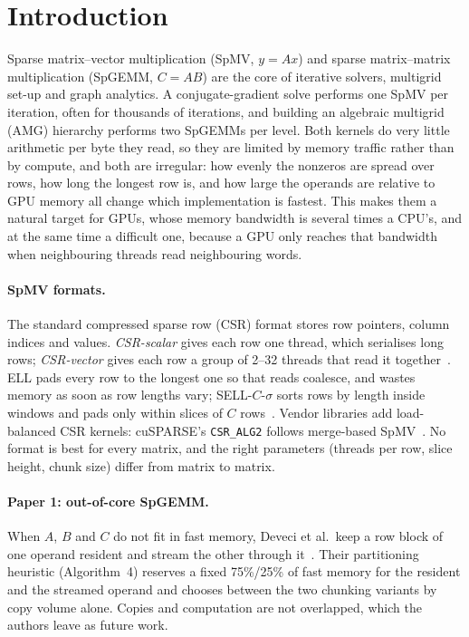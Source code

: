 \section{Introduction}\label{sec:intro}

Sparse matrix--vector multiplication (SpMV, $y = Ax$) and sparse matrix--matrix multiplication (SpGEMM,
$C = AB$) are the core of iterative solvers, multigrid set-up and graph analytics. A conjugate-gradient solve
performs one SpMV per iteration, often for thousands of iterations, and building an algebraic multigrid (AMG)
hierarchy performs two SpGEMMs per level. Both kernels do very little arithmetic per byte they read, so they are
limited by memory traffic rather than by compute, and both are irregular: how evenly the nonzeros are spread over
rows, how long the longest row is, and how large the operands are relative to GPU memory all change which
implementation is fastest. This makes them a natural target for GPUs, whose memory bandwidth is several times a
CPU's, and at the same time a difficult one, because a GPU only reaches that bandwidth when neighbouring threads read
neighbouring words.

\paragraph{SpMV formats.} The standard compressed sparse row (CSR) format stores row pointers, column indices and
values. \emph{CSR-scalar} gives each row one thread, which serialises long rows; \emph{CSR-vector} gives each row a
group of 2--32 threads that read it together~\cite{bell2009spmv}. ELL pads every row to the longest one so that reads
coalesce, and wastes memory as soon as row lengths vary; SELL-$C$-$\sigma$ sorts rows by length inside windows and
pads only within slices of $C$ rows~\cite{kreutzer2014sell}. Vendor libraries add load-balanced CSR kernels: cuSPARSE's
\texttt{CSR\_ALG2} follows merge-based SpMV~\cite{merrill2016merge}. No format is best for every matrix, and the
right parameters (threads per row, slice height, chunk size) differ from matrix to matrix.

\paragraph{Paper 1: out-of-core SpGEMM.} When $A$, $B$ and $C$ do not fit in fast memory, Deveci et al.\
keep a row block of one operand resident and stream the other through it~\cite{deveci2018multilevel}. Their
partitioning heuristic (Algorithm~4) reserves a fixed 75\%/25\% of fast memory for the resident and the streamed
operand and chooses between the two chunking variants by copy volume alone. Copies and computation are not
overlapped, which the authors leave as future work.

